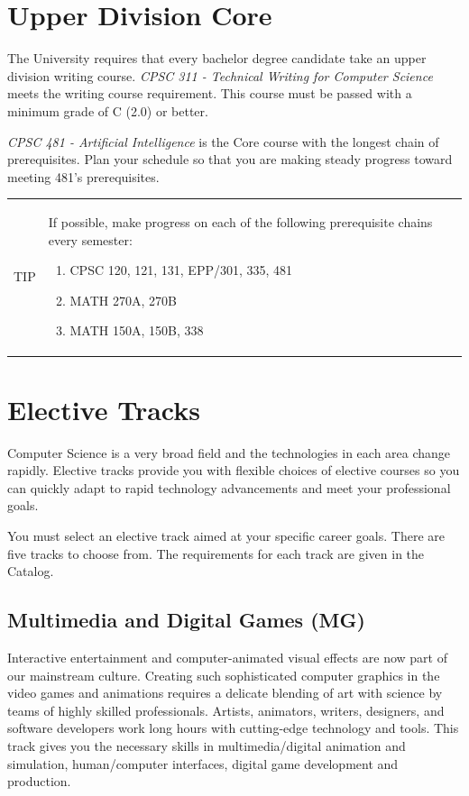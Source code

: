 \documentclass{book}
\newenvironment{tip}{
  \tcolorbox \begin{tabular}{m{.5in} m{5.25in}}
    \Large{TIP} &
}{
  \end{tabular} \endtcolorbox
}
\newcommand{\MgTrackName}{Multimedia and Digital Games (MG)}
\begin{document}
\section{Upper Division Core}

The University requires that every bachelor degree candidate take an upper division writing course. \emph{CPSC 311 - Technical Writing for Computer Science} meets the writing course requirement. This course must be passed with a minimum grade of C (2.0) or better.

\emph{CPSC 481 - Artificial Intelligence} is the Core course with the longest chain of prerequisites. Plan your schedule so that you are making steady progress toward meeting 481's prerequisites.

\begin{tip}
  If possible, make progress on each of the following prerequisite chains every semester:
  \begin{enumerate}
  \item CPSC 120, 121, 131, EPP/301, 335, 481
  \item MATH 270A, 270B
  \item MATH 150A, 150B, 338
  \end{enumerate}
\end{tip}

\section{Elective Tracks}
 
Computer Science is a very broad field and the technologies in each area change rapidly. Elective tracks provide you with flexible choices of elective courses so you can quickly adapt to rapid technology advancements and meet your professional goals.

You must select an elective track aimed at your specific career goals. There are five tracks to choose from. The requirements for each track are given in the Catalog.

\subsection{\MgTrackName}
\MgTrackIndex
Interactive entertainment and computer-animated visual effects are now part of our mainstream culture. Creating such sophisticated computer graphics in the video games and animations requires a delicate blending of art with science by teams of highly skilled professionals. Artists, animators, writers, designers, and software developers work long hours with cutting-edge technology and tools. This track gives you the necessary skills in multimedia/digital animation and simulation, human/computer interfaces, digital game development and production.
\end{document}
